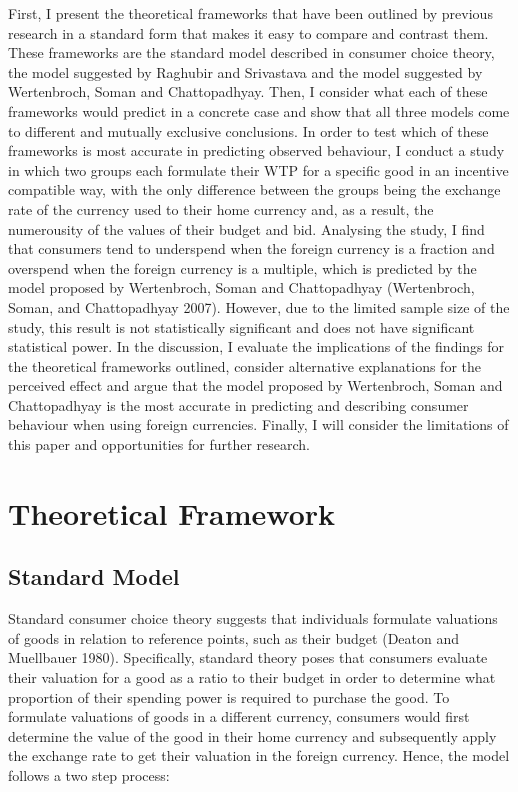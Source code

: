 \documentclass[
]{report}
\begin{document}
First, I present the theoretical frameworks that have been outlined by
previous research in a standard form that makes it easy to compare and
contrast them. These frameworks are the standard model described in
consumer choice theory, the model suggested by Raghubir and Srivastava
and the model suggested by Wertenbroch, Soman and Chattopadhyay. Then, I
consider what each of these frameworks would predict in a concrete case
and show that all three models come to different and mutually exclusive
conclusions. In order to test which of these frameworks is most accurate
in predicting observed behaviour, I conduct a study in which two groups
each formulate their WTP for a specific good in an incentive compatible
way, with the only difference between the groups being the exchange rate
of the currency used to their home currency and, as a result, the
numerousity of the values of their budget and bid. Analysing the study,
I find that consumers tend to underspend when the foreign currency is a
fraction and overspend when the foreign currency is a multiple, which is
predicted by the model proposed by Wertenbroch, Soman and Chattopadhyay
(Wertenbroch, Soman, and Chattopadhyay 2007). However, due to the
limited sample size of the study, this result is not statistically
significant and does not have significant statistical power. In the
discussion, I evaluate the implications of the findings for the
theoretical frameworks outlined, consider alternative explanations for
the perceived effect and argue that the model proposed by Wertenbroch,
Soman and Chattopadhyay is the most accurate in predicting and
describing consumer behaviour when using foreign currencies. Finally, I
will consider the limitations of this paper and opportunities for
further research.

\chapter{Theoretical Framework}\label{theoretical-framework}

\section{Standard Model}\label{standard-model}

Standard consumer choice theory suggests that individuals formulate
valuations of goods in relation to reference points, such as their
budget (Deaton and Muellbauer 1980). Specifically, standard theory poses
that consumers evaluate their valuation for a good as a ratio to their
budget in order to determine what proportion of their spending power is
required to purchase the good. To formulate valuations of goods in a
different currency, consumers would first determine the value of the
good in their home currency and subsequently apply the exchange rate to
get their valuation in the foreign currency. Hence, the model follows a
two step process:
\end{document}
